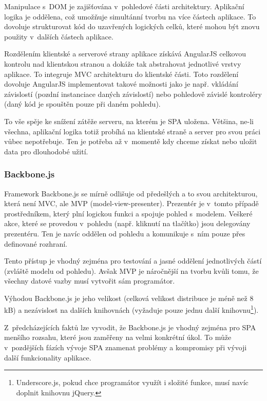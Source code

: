 Manipulace s~DOM je zajišťována v~pohledové části architektury. Aplikační logika je oddělena, což umožňuje simultánní tvorbu na více částech aplikace. To dovoluje strukturovat kód do uzavřených logických celků, které mohou být znovu použity v~dalších částech aplikace.

Rozdělením klientské a serverové strany aplikace získává AngularJS celkovou kontrolu nad klientskou stranou a dokáže tak abstrahovat jednotlivé vrstvy aplikace. To integruje MVC architekturu do klientské části. Toto rozdělení dovoluje AngularJS implementovat takové možnosti jako je např. vkládání závislostí (pozdní instanciace daných závislostí) nebo pohledově závislé kontroléry (daný kód je spouštěn pouze při daném pohledu).

To vše spěje ke snížení zátěže serveru, na kterém je SPA uložena. Většina, ne-li všechna, aplikační logika totiž probíhá na klientské straně a server pro svou práci vůbec nepotřebuje. Ten je potřeba až v~momentě kdy chceme získat nebo uložit data pro dlouhodobé užití.

\subsubsection*{Backbone.js}

Framework Backbone.js se mírně odlišuje od předešlých a to svou architekturou, která není MVC, ale MVP (model-view-presenter). Prezentér je v~tomto případě prostředníkem, který plní logickou funkci a spojuje pohled s~modelem. Veškeré akce, které se provedou v~pohledu (např. kliknutí na tlačítko) jsou delegovány prezentéru. Ten je navíc oddělen od pohledu a komunikuje s~ním pouze přes definované rozhraní.

Tento přístup je vhodný zejména pro testování a jasné oddělení jednotlivých částí (zvláště modelu od pohledu). Avšak MVP je náročnější na tvorbu kvůli tomu, že všechny datové vazby musí vytvořit sám programátor.

Výhodou Backbone.js je jeho velikost (celková velikost distribuce je méně než 8 kB) a nezávislost na dalších knihovnách (vyžaduje pouze jednu další knihovnu\footnote{Underscore.js, pokud chce programátor využít i složité funkce, musí navíc doplnit knihovnu jQuery.}).

Z~předcházejících faktů lze vyvodit, že Backbone.js je vhodný zejména pro SPA menšího rozsahu, které jsou zaměřeny na velmi konkrétní úkol. To může v~pozdějších fázích vývoje SPA znamenat problémy a kompromisy při vývoji další funkcionality aplikace.

